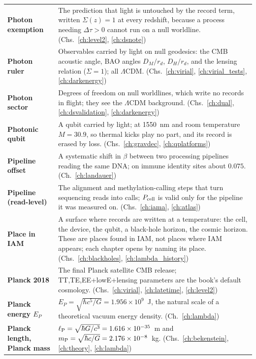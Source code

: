 {\begin{longtable}{@{}>{\raggedright\arraybackslash}p{}>{\raggedright\arraybackslash}p{}@{}}
\textbf{Photon exemption} & The prediction that light is untouched by the record term, written $\Sigma(z)=1$ at every redshift, because a process needing $\Delta\tau>0$ cannot run on a null worldline. {\footnotesize(Chs.~\ref{ch:level2}, \ref{ch:dsnote})}\\[1pt]
\textbf{Photon ruler} & Observables carried by light on null geodesics: the CMB acoustic angle, BAO angles $D_M/r_d$, $D_H/r_d$, and the lensing relation ($\Sigma=1$); all $\Lambda$CDM. {\footnotesize(Chs.~\ref{ch:virial}, \ref{ch:virial_tests}, \ref{ch:darkenergy})}\\[1pt]
\textbf{Photon sector} & Degrees of freedom on null worldlines, which write no records in flight; they see the $\Lambda$CDM background. {\footnotesize(Chs.~\ref{ch:dual}, \ref{ch:dsvalidation}, \ref{ch:darkenergy})}\\[1pt]
\textbf{Photonic qubit} & A qubit carried by light; at 1550~nm and room temperature $M=30.9$, so thermal kicks play no part, and its record is erased by loss. {\footnotesize(Chs.~\ref{ch:gravdec}, \ref{ch:qplatforms})}\\[1pt]
\textbf{Pipeline offset} & A systematic shift in $\beta$ between two processing pipelines reading the same DNA; on immune identity sites about $0.075$. {\footnotesize(Ch.~\ref{ch:landauer})}\\[1pt]
\textbf{Pipeline (read-level)} & The alignment and methylation-calling steps that turn sequencing reads into calls; $P_{\rm cell}$ is valid only for the pipeline it was measured on. {\footnotesize(Chs.~\ref{ch:iama}, \ref{ch:atlas})}\\[1pt]
\textbf{Place in IAM} & A surface where records are written at a temperature: the cell, the device, the qubit, a black-hole horizon, the cosmic horizon. These are places found in IAM, not places where IAM appears; each chapter opens by naming its place. {\footnotesize(Chs.~\ref{ch:blackholes}, \ref{ch:lambda_history})}\\[1pt]
\textbf{Planck 2018} & The final Planck satellite CMB release; TT,TE,EE+lowE+lensing parameters are the book's default cosmology. {\footnotesize(Chs.~\ref{ch:virial}, \ref{ch:latetime}, \ref{ch:level2})}\\[1pt]
\textbf{Planck energy $E_P$} & $E_P=\sqrt{\hbar c^5/G}=1.956\times10^9$~J, the natural scale of a theoretical vacuum energy density. {\footnotesize(Ch.~\ref{ch:lambda})}\\[1pt]
\textbf{Planck length, Planck mass} & $\ell_{\mathrm P}=\sqrt{\hbar G/c^3}=1.616\times10^{-35}$~m and $m_{\mathrm P}=\sqrt{\hbar c/G}=2.176\times10^{-8}$~kg. {\footnotesize(Chs.~\ref{ch:bekenstein}, \ref{ch:theory}, \ref{ch:lambda})}\\[1pt]

\end{longtable}}
